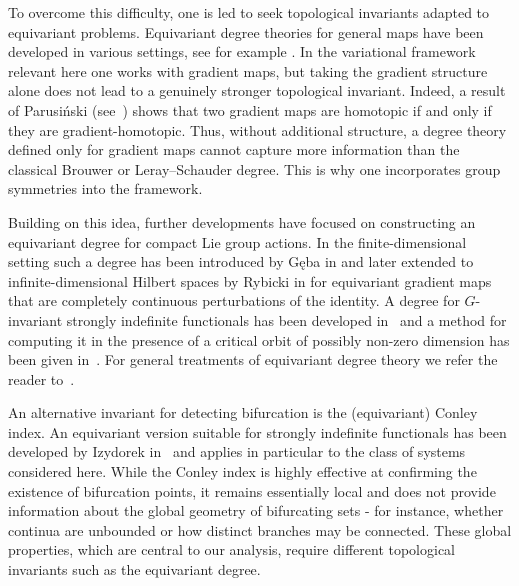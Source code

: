 \documentclass[reqno,twoside,12pt]{amsart}
\numberwithin{equation}{section} \errorcontextlines=0
\begin{document}
To overcome this difficulty, one is led to seek topological invariants adapted to equivariant problems. Equivariant degree theories for general maps have been developed in various settings, see for example \cite{IzeVig, KusBal}. In the variational framework relevant here one works with gradient maps, but taking the gradient structure alone does not lead to a genuinely stronger topological invariant. Indeed, a result of Parusiński (see~\cite{Parusinski}) shows that two gradient maps are homotopic if and only if they are gradient-homotopic. Thus, without additional structure, a degree theory defined only for gradient maps cannot capture more information than the classical Brouwer or Leray--Schauder degree. This is why one incorporates group symmetries into the framework.

Building on this idea, further developments have focused on constructing an equivariant degree for compact Lie group actions. In the finite-dimensional setting such a degree has been introduced by Gęba in \cite{Geba} and later extended to infinite-dimensional Hilbert spaces by Rybicki in \cite{Ryb2005milano} for equivariant gradient maps that are completely continuous perturbations of the identity. A degree for $G$-invariant strongly indefinite functionals has been developed in~\cite{GolRyb} and a method for computing it in the presence of a critical orbit of possibly non-zero dimension has been given in~\cite{GS2020}. For general treatments of equivariant degree theory we refer the reader to~\cite{BKS}.

An alternative invariant for detecting bifurcation is the (equivariant) Conley index. An equivariant version suitable for strongly indefinite functionals has been developed by Izydorek in~\cite{Izydorek} and applies in particular to the class of systems considered here. While the Conley index is highly effective at confirming the existence of bifurcation points, it remains essentially local and does not provide information about the global geometry of bifurcating sets - for instance, whether continua are unbounded or how distinct branches may be connected. These global properties, which are central to our analysis, require different topological invariants such as the equivariant degree.
\end{document}

